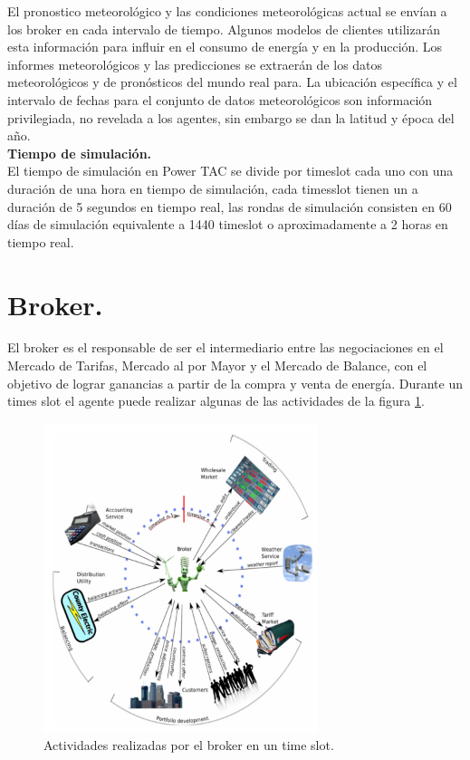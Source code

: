 El pronostico meteorológico y las condiciones meteorológicas actual se envían a los broker en cada intervalo de tiempo. Algunos modelos de clientes utilizarán esta información para influir en el consumo de energía y en la producción. Los informes meteorológicos y las predicciones se extraerán de los datos meteorológicos y de pronósticos del mundo real para. La ubicación específica y el intervalo de fechas para el conjunto de datos meteorológicos son información privilegiada, no revelada a los agentes, sin embargo se dan la latitud y época del año.\\

\textbf{Tiempo de simulación.}\\

El tiempo de simulación en Power TAC se divide por timeslot cada uno con una duración de una hora en tiempo de simulación, cada timesslot tienen un a duración de 5 segundos en tiempo real, las rondas de simulación consisten en 60 días de simulación equivalente a 1440 timeslot o aproximadamente a 2 horas en tiempo real.\\

\section{Broker.}

El broker es el responsable de ser el intermediario entre las negociaciones en el Mercado de Tarifas, Mercado al por Mayor y el Mercado de Balance, con el objetivo de lograr ganancias a partir de la compra y venta de energía. Durante un times slot el agente puede realizar algunas de las actividades de la figura \ref{activity}.

\begin{figure}[!h]
	\centering
	\includegraphics[width=8cm]{img/process.png}
	\caption{Actividades realizadas por el broker en un time slot.}
	\label{activity}
\end{figure}

